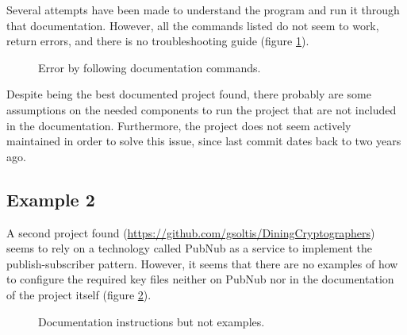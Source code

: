 Several attempts have been made to understand the program and run it through that documentation. However, all the commands listed do not seem to work, return errors, and there is no troubleshooting guide (figure \ref{fig:work1error}).


\begin{figure}[H]
    \centering
    \caption{Error by following documentation commands.}
    \label{fig:work1error}
\end{figure}

Despite being the best documented project found, there probably are some assumptions on the needed components to run the project that are not included in the documentation. Furthermore, the project does not seem actively maintained in order to solve this issue, since last commit dates back to two years ago. 

\subsection{Example 2}
A second project found (\url{https://github.com/gsoltis/DiningCryptographers}) seems to rely on a technology called PubNub as a service to implement the publish-subscriber pattern. However, it seems that there are no examples of how to configure the required key files neither on PubNub nor in the documentation of the project itself (figure \ref{fig:work2documentation}).

\begin{figure}[H]
    \centering
    \caption{Documentation instructions but not examples.}
    \label{fig:work2documentation}
\end{figure}

